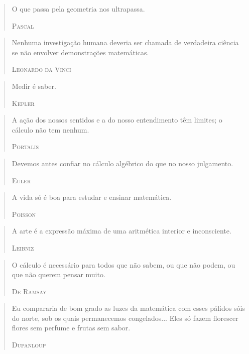 \documentclass{hipatia}
\begin{document}
\begin{quote}
O que passa pela geometria nos ultrapassa.

\hfill \textsc{Pascal}
\end{quote}

 

\begin{quote}
    Nenhuma investigação humana deveria ser chamada de verdadeira ciência se não envolver demonstrações matemáticas.

\hfill \textsc{Leonardo da Vinci}
\end{quote}

 
\begin{quote}
Medir é saber.

\hfill \textsc{Kepler}
\end{quote}

 
\begin{quote}
A ação dos nossos sentidos e a do nosso entendimento têm limites; o cálculo não tem nenhum.

\hfill \textsc{Portalis}
\end{quote}
 
\begin{quote}
Devemos antes confiar no cálculo algébrico do que no nosso julgamento.

\hfill \textsc{Euler}
\end{quote}

 
\begin{quote}
A vida só é boa para estudar e ensinar matemática.

\hfill \textsc{Poisson}
\end{quote}

 
\begin{quote}
A arte é a expressão máxima de uma aritmética interior e inconsciente.

\hfill \textsc{Leibniz}
\end{quote}


\begin{quote}
O cálculo é necessário para todos que não sabem, ou que não podem, ou que não querem pensar muito.

\hfill \textsc{De Ramsay}
\end{quote}

 



\begin{quote}
Eu compararia de bom grado as luzes da matemática com esses pálidos sóis do norte, sob os quais permanecemos congelados... Eles só fazem florescer flores sem perfume e frutas sem sabor.

\hfill \textsc{Dupanloup}
\end{quote}
\end{document}
